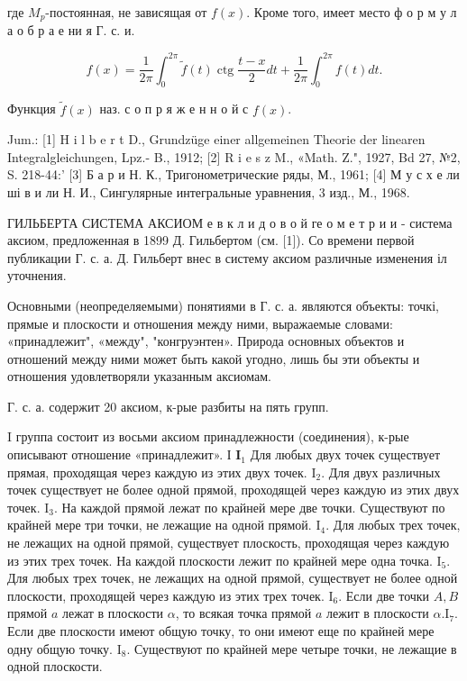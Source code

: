 \documentclass[10pt]{article}
\begin{document}
где $M_{p}$-постоянная, не зависящая от $f(x)$. Кроме того, имеет место ф о р м у л а о б р а е ни я Г. с. и.



\[

f(x)=\frac{1}{2 \pi} \int_{0}^{2 \pi} \tilde{f}(t) \operatorname{ctg} \frac{t-x}{2} d t+\frac{1}{2 \pi} \int_{0}^{2 \pi} f(t) d t .

\]



Функция $\tilde{f}(x)$ наз. с о п р я ж е н н о й с $f(x)$.



Jum.: [1] H i l b e r t D., Grundzüge einer allgemeinen Theorie der linearen Integralgleichungen, Lpz.- B., 1912; [2] R i e s z M., «Math. Z.", 1927, Bd 27, №2, S. 218-44:' [3] Б а р и Н. К., Тригонометрические ряды, М., 1961; [4] М у с х е ли ші в и ли Н. И., Сингулярные интегральные уравнения, 3 изд., М., 1968.



ГИЛЬБЕРТА СИСТЕМА АКСИОМ е в к л и д о в о й ге о м е т р и и - система аксиом, предложенная в 1899 Д. Гильбертом (см. [1]). Со времени первой публикации Г. с. а. Д. Гильберт внес в систему аксиом различные изменения іл уточнения.



Основными (неопределяемыми) понятиями в Г. с. а. являются объекты: точкі, прямые и плоскости и отношения между ними, выражаемые словами: «принадлежит", «между", "конгруэнтен». Природа основных объектов и отношений между ними может быть какой угодно, лишь бы эти объекты и отношения удовлетворяли указанным аксиомам.



Г. с. а. содержит 20 аксиом, к-рые разбиты на пять групп.



I группа состоит из восьми аксиом принадлежности (соединения), к-рые описывают отношение «принадлежит». І $\mathbf{I}_{1}$ Для любых двух точек существует прямая, проходящая через каждую из этих двух точек. $\mathrm{I}_{2}$. Для двух различных точек существует не более одной прямой, проходящей через каждую из этих двух точек. $\mathrm{I}_{3}$. На каждой прямой лежат по крайней мере две точки. Существуют по крайней мере три точки, не лежащие на одной прямой. $\mathrm{I}_{4}$. Для любых трех точек, не лежащих на одной прямой, существует плоскость, проходящая через каждую из этих трех точек. На каждой плоскости лежит по крайней мере одна точка. $\mathrm{I}_{5}$. Для любых трех точек, не лежащих на одной прямой, существует не более одной плоскости, проходящей через каждую из этих трех точек. $\mathrm{I}_{6}$. Если две точки $A, B$ прямой $a$ лежат в плоскости $\alpha$, то всякая точка прямой $a$ лежит в плоскости $\alpha . \mathrm{I}_{7}$. Если две плоскости имеют общую точку, то они имеют еще по крайней мере одну общую точку. $\mathrm{I}_{8}$. Существуют по крайней мере четыре точки, не лежащие в одной плоскости.
\end{document}
